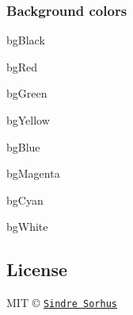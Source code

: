 \subsubsection*{Background colors}


\begin{DoxyItemize}
\item {\ttfamily bg\+Black}
\item {\ttfamily bg\+Red}
\item {\ttfamily bg\+Green}
\item {\ttfamily bg\+Yellow}
\item {\ttfamily bg\+Blue}
\item {\ttfamily bg\+Magenta}
\item {\ttfamily bg\+Cyan}
\item {\ttfamily bg\+White}
\end{DoxyItemize}

\subsection*{License}

M\+IT © \href{http://sindresorhus.com}{\tt Sindre Sorhus} 